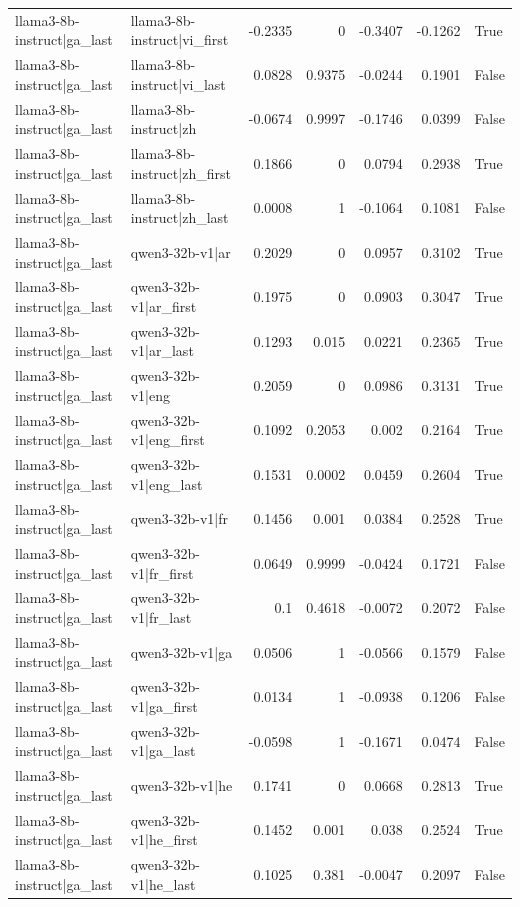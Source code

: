 \begin{table}
\begin{tabular}{l l r r r r l}
llama3-8b-instruct|ga_last & llama3-8b-instruct|vi_first & -0.2335 & 0 & -0.3407 & -0.1262 & True \\
llama3-8b-instruct|ga_last & llama3-8b-instruct|vi_last & 0.0828 & 0.9375 & -0.0244 & 0.1901 & False \\
llama3-8b-instruct|ga_last & llama3-8b-instruct|zh & -0.0674 & 0.9997 & -0.1746 & 0.0399 & False \\
llama3-8b-instruct|ga_last & llama3-8b-instruct|zh_first & 0.1866 & 0 & 0.0794 & 0.2938 & True \\
llama3-8b-instruct|ga_last & llama3-8b-instruct|zh_last & 0.0008 & 1 & -0.1064 & 0.1081 & False \\
llama3-8b-instruct|ga_last & qwen3-32b-v1|ar & 0.2029 & 0 & 0.0957 & 0.3102 & True \\
llama3-8b-instruct|ga_last & qwen3-32b-v1|ar_first & 0.1975 & 0 & 0.0903 & 0.3047 & True \\
llama3-8b-instruct|ga_last & qwen3-32b-v1|ar_last & 0.1293 & 0.015 & 0.0221 & 0.2365 & True \\
llama3-8b-instruct|ga_last & qwen3-32b-v1|eng & 0.2059 & 0 & 0.0986 & 0.3131 & True \\
llama3-8b-instruct|ga_last & qwen3-32b-v1|eng_first & 0.1092 & 0.2053 & 0.002 & 0.2164 & True \\
llama3-8b-instruct|ga_last & qwen3-32b-v1|eng_last & 0.1531 & 0.0002 & 0.0459 & 0.2604 & True \\
llama3-8b-instruct|ga_last & qwen3-32b-v1|fr & 0.1456 & 0.001 & 0.0384 & 0.2528 & True \\
llama3-8b-instruct|ga_last & qwen3-32b-v1|fr_first & 0.0649 & 0.9999 & -0.0424 & 0.1721 & False \\
llama3-8b-instruct|ga_last & qwen3-32b-v1|fr_last & 0.1 & 0.4618 & -0.0072 & 0.2072 & False \\
llama3-8b-instruct|ga_last & qwen3-32b-v1|ga & 0.0506 & 1 & -0.0566 & 0.1579 & False \\
llama3-8b-instruct|ga_last & qwen3-32b-v1|ga_first & 0.0134 & 1 & -0.0938 & 0.1206 & False \\
llama3-8b-instruct|ga_last & qwen3-32b-v1|ga_last & -0.0598 & 1 & -0.1671 & 0.0474 & False \\
llama3-8b-instruct|ga_last & qwen3-32b-v1|he & 0.1741 & 0 & 0.0668 & 0.2813 & True \\
llama3-8b-instruct|ga_last & qwen3-32b-v1|he_first & 0.1452 & 0.001 & 0.038 & 0.2524 & True \\
llama3-8b-instruct|ga_last & qwen3-32b-v1|he_last & 0.1025 & 0.381 & -0.0047 & 0.2097 & False \\

\end{tabular}
\end{table}
